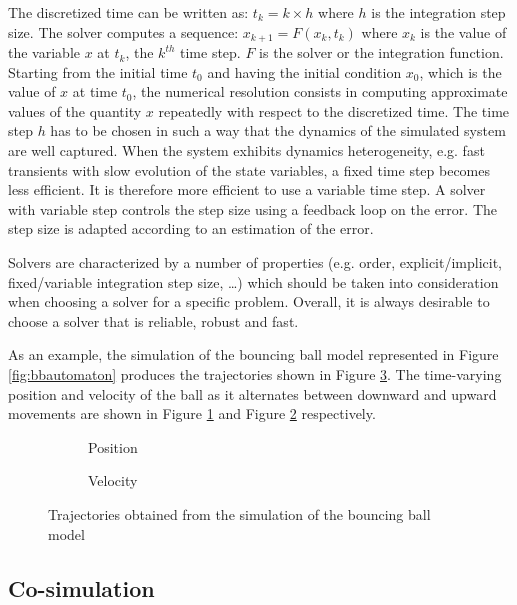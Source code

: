 The discretized time can be written as: $t_k = k \times h$ where $h$ is the integration step size. The solver computes a sequence: $x_{k+1} = F(x_k,t_k)$ where $x_k$ is the value of the variable $x$ at $t_k$, the $k^{th}$ time step. $F$ is the solver or the integration function. Starting from the initial time $t_0$ and having the initial condition $x_0$, which is the value of $x$ at time $t_0$, the numerical resolution consists in computing approximate values of the quantity $x$ repeatedly with respect to the discretized time. The time step $h$ has to be chosen in such a way that the dynamics of the simulated system are well captured. When the system exhibits dynamics heterogeneity, e.g. fast transients with slow evolution of the state variables, a fixed time step becomes less efficient. It is therefore  more efficient to use a variable time step. A solver with variable step controls the step size using a feedback loop on the error. The step size is adapted according to an estimation of the error. 

Solvers are characterized by a number of properties (e.g. order, explicit/implicit, fixed/variable integration step size, \ldots) which should be taken into consideration when choosing a solver for a specific problem. Overall, it is always desirable to choose a solver that is reliable, robust and fast.

As an example, the simulation of the bouncing ball model represented in Figure \ref{fig:bbautomaton} produces the trajectories shown in Figure \ref{fig:bbsim}. The time-varying position and velocity of the ball as it alternates between downward and upward movements are shown in Figure \ref{fig:bbpos} and Figure \ref{fig:bbve} respectively.

\begin{figure}[phtb]
\centering
\begin{subfigure}{\textwidth}
  \centering
  
  \caption{Position}
  \label{fig:bbpos}
\end{subfigure}

\begin{subfigure}{\textwidth}
  \centering
  
  \caption{Velocity}
  \label{fig:bbve}
\end{subfigure}
\caption{Trajectories obtained from the simulation of the bouncing ball model}
\label{fig:bbsim}
\end{figure}

\subsection{Co-simulation}

